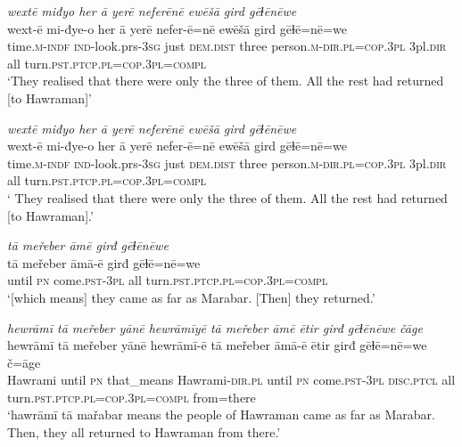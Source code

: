 \ea \label{BP.107}
\textit{wextē miđyo her ā yerē neferēnē ewēšā gird gēɫēnēwe} \\ 
\gll wext-ē mi-đye-o her ā yerē nefer-ē=nē ewēšā gird gēɫē=nē=we \\ 
 time\textsc{.m}\textsc{-indf} \textsc{ind-}look.prs\textsc{-3sg} just \textsc{dem.dist} three person\textsc{.m}\textsc{-dir}\textsc{.pl}\textsc{=cop}\textsc{.3pl} 3pl\textsc{.dir} all turn\textsc{.pst}\textsc{.ptcp}\textsc{.pl}\textsc{=cop}\textsc{.3pl}\textsc{=compl} \\ 
\glt `They realised that there were only the three of them. All the rest had returned [to Hawraman]'
\z 
 
\ea \label{BP.108}
\textit{wextē miđyo her ā yerē neferēnē ewēšā gird gēɫēnēwe} \\ 
\gll wext-ē mi-đye-o her ā yerē nefer-ē=nē ewēšā gird gēɫē=nē=we \\ 
 time\textsc{.m}\textsc{-indf} \textsc{ind-}look.prs\textsc{-3sg} just \textsc{dem.dist} three person\textsc{.m}\textsc{-dir}\textsc{.pl}\textsc{=cop}\textsc{.3pl} 3pl\textsc{.dir} all turn\textsc{.pst}\textsc{.ptcp}\textsc{.pl}\textsc{=cop}\textsc{.3pl}\textsc{=compl} \\ 
\glt ` They realised that there were only the three of them. All the rest had returned [to Hawraman].'
\z 
 
\ea \label{BP.114}
\textit{tā meřeber āmē girđ gēɫēnēwe} \\ 
\gll tā meřeber āmā-ē girđ gēɫē=nē=we \\ 
 until \textsc{pn} come\textsc{.pst}\textsc{-3pl} all turn\textsc{.pst}\textsc{.ptcp}\textsc{.pl}\textsc{=cop}\textsc{.3pl}\textsc{=compl} \\ 
\glt `[which means] they came as far as Marabar. [Then] they returned.'
\z 
 
\ea \label{BP.115}
\textit{hewrāmī tā meřeber yānē hewrāmīyē tā meřeber āmē ētir girđ gēɫēnēwe čāge} \\ 
\gll hewrāmī tā meřeber yānē hewrāmī-ē tā meřeber āmā-ē ētir girđ gēɫē=nē=we č=āge \\ 
 Hawrami until \textsc{pn} that\_means Hawrami\textsc{-dir}\textsc{.pl} until \textsc{pn} come\textsc{.pst}\textsc{-3pl} \textsc{disc.ptcl} all turn\textsc{.pst}\textsc{.ptcp}\textsc{.pl}\textsc{=cop}\textsc{.3pl}\textsc{=compl} from=there \\ 
\glt `hawrāmī tā mařabar means the people of Hawraman came as far as Marabar. Then, they all returned to Hawraman from there.'
\z 
 
